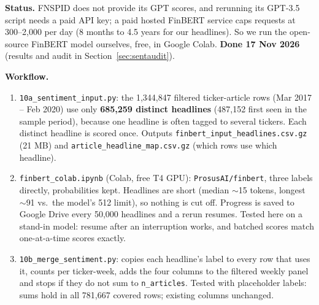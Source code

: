 \documentclass[11pt]{article}
\newcommand{\var}[1]{\texttt{#1}}
\begin{document}
\textbf{Status.} FNSPID does not provide its GPT scores, and rerunning its GPT-3.5 script needs a paid API key; a paid hosted FinBERT service caps requests at 300--2,000 per day (8 months to 4.5 years for our headlines). So we run the open-source FinBERT model ourselves, free, in Google Colab. \textbf{Done 17 Nov 2026} (results and audit in Section~\ref{sec:sentaudit}).

\textbf{Workflow.}
\begin{enumerate}
  \item \var{10a\_sentiment\_input.py}: the 1,344,847 filtered ticker-article rows (Mar 2017 -- Feb 2020) use only \textbf{685,259 distinct headlines} (487,152 first seen in the sample period), because one headline is often tagged to several tickers. Each distinct headline is scored once. Outputs \var{finbert\_input\_headlines.csv.gz} (21 MB) and \var{article\_headline\_map.csv.gz} (which rows use which headline).
  \item \var{finbert\_colab.ipynb} (Colab, free T4 GPU): \var{ProsusAI/finbert}, three labels directly, probabilities kept. Headlines are short (median $\sim$15 tokens, longest $\sim$91 vs.\ the model's 512 limit), so nothing is cut off. Progress is saved to Google Drive every 50,000 headlines and a rerun resumes. Tested here on a stand-in model: resume after an interruption works, and batched scores match one-at-a-time scores exactly.
  \item \var{10b\_merge\_sentiment.py}: copies each headline's label to every row that uses it, counts per ticker-week, adds the four columns to the filtered weekly panel and stops if they do not sum to \var{n\_articles}. Tested with placeholder labels: sums hold in all 781,667 covered rows; existing columns unchanged.
\end{enumerate}
\end{document}
